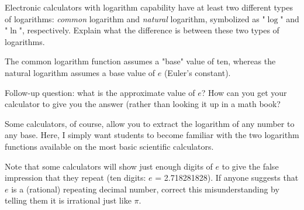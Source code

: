 

Electronic calculators with logarithm capability have at least two different types of logarithms: {\it common} logarithm and {\it natural} logarithm, symbolized as "$\log$" and "$\ln$", respectively.  Explain what the difference is between these two types of logarithms.







The common logarithm function assumes a "base" value of ten, whereas the natural logarithm assumes a base value of $e$ (Euler's constant).

\vskip 10pt

Follow-up question: what is the approximate value of $e$?  How can you get your calculator to give you the answer (rather than looking it up in a math book?







Some calculators, of course, allow you to extract the logarithm of any number to any base.  Here, I simply want students to become familiar with the two logarithm functions available on the most basic scientific calculators.

Note that some calculators will show just enough digits of $e$ to give the false impression that they repeat (ten digits: $e$ = 2.718281828).  If anyone suggests that $e$ is a (rational) repeating decimal number, correct this misunderstanding by telling them it is irrational just like $\pi$.




